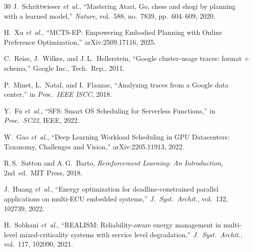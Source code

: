 \documentclass[10pt,journal,compsoc]{IEEEtran}
\begin{document}
\begin{thebibliography}{30}
J.~Schrittwieser \emph{et~al.},
``Mastering Atari, Go, chess and shogi by planning with a learned model,''
\emph{Nature}, vol.~588, no.~7839, pp.~604--609, 2020.

H.~Xu \emph{et~al.},
``MCTS-EP: Empowering Embodied Planning with Online Preference
Optimization,'' arXiv:2509.17116, 2025.

C.~Reiss, J.~Wilkes, and J.\,L.~Hellerstein,
``Google cluster-usage traces: format + schema,''
Google Inc., Tech.\ Rep., 2011.

P.~Minet, L.~Nataf, and I.~Flauzac,
``Analyzing traces from a Google data center,''
in \emph{Proc.\ IEEE ISCC}, 2018.

Y.~Fu \emph{et~al.},
``SFS: Smart OS Scheduling for Serverless Functions,''
in \emph{Proc.\ SC22}, IEEE, 2022.

W.~Gao \emph{et~al.},
``Deep Learning Workload Scheduling in GPU Datacenters: Taxonomy,
Challenges and Vision,'' arXiv:2205.11913, 2022.

R.\,S.~Sutton and A.\,G.~Barto,
\emph{Reinforcement Learning: An Introduction}, 2nd~ed.\ MIT Press, 2018.

J.~Huang \emph{et~al.},
``Energy optimization for deadline-constrained parallel applications
on multi-ECU embedded systems,''
\emph{J.\ Syst.\ Archit.}, vol.~132, 102739, 2022.

H.~Sobhani \emph{et~al.},
``REALISM: Reliability-aware energy management in multi-level
mixed-criticality systems with service level degradation,''
\emph{J.\ Syst.\ Archit.}, vol.~117, 102090, 2021.

\end{thebibliography}
\end{document}
